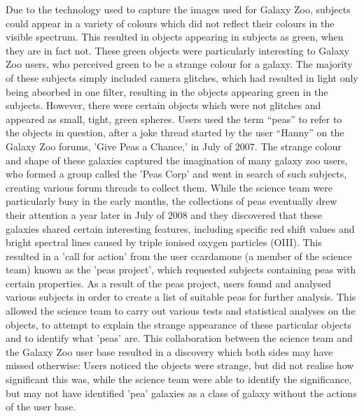 \documentclass{sigchi}
\begin{document}

Due to the technology used to capture the images used for Galaxy Zoo, subjects could appear in a variety of colours which did not reflect their colours in the visible spectrum. This resulted in objects appearing in subjects as green, when they are in fact not. These green objects were particularly interesting to Galaxy Zoo users, who perceived green to be a strange colour for a galaxy.
The majority of these subjects simply included camera glitches, which had resulted in light only being absorbed in one filter, resulting in the objects appearing green in the subjects. However, there were certain objects which were not glitches and appeared as small, tight, green spheres. Users used the term “peas” to refer to the objects in question, after a joke thread started by the user “Hanny” on the Galaxy Zoo forums, 'Give Peas a Chance,' in July of 2007.
The strange colour and shape of these galaxies captured the imagination of many galaxy zoo  users, who formed a group called the 'Peas Corp' and went in search of such subjects, creating various forum threads to collect them. While the science team were particularly busy in the early months, the collections of peas eventually drew their attention a year later in July of 2008 and they discovered that these galaxies shared  certain interesting features, including specific red shift values and bright spectral lines caused by triple ionised oxygen particles (OIII). This resulted in a 'call for action' from the user ccardamone (a member of the science team) known as the 'peas project', which requested subjects containing peas with certain properties.
As a result of the peas project, users found and analysed various subjects in order to create a list of suitable peas for further analysis. This allowed the science team to carry out various tests and statistical analyses on the objects, to attempt to explain the strange appearance of these particular objects and to identify what 'peas' are. This collaboration between the science team and the Galaxy Zoo user base resulted in a discovery which both sides may have missed otherwise: Users noticed the objects were strange, but did not realise how significant this was, while the science team were able to identify the significance, but may not have identified 'pea' galaxies as a class of galaxy without the actions of the user base.

\end{document}
